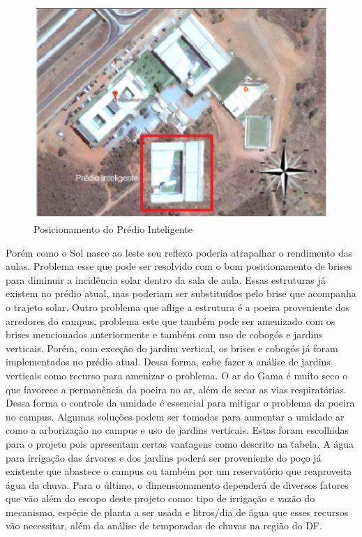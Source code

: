 \begin{figure}[!h]
  \centering
  \includegraphics[keepaspectratio=true,scale=1]{figuras/posicionamentodoprediointeligente.eps}
  \caption{Posicionamento do Prédio Inteligente}
  \label{fig:posicionamento}
\end{figure}

Porém como o Sol nasce ao leste seu reflexo poderia atrapalhar o rendimento das aulas. Problema esse que pode ser resolvido com o bom posicionamento de brises para diminuir a incidência solar dentro da sala de aula. Essas estruturas já existem no prédio atual, mas poderiam ser substituídos pelo brise que acompanha o trajeto solar.
Outro problema que aflige a estrutura é a poeira proveniente dos arredores do campus, problema este que também pode ser amenizado com os brises mencionados anteriormente e também com uso de cobogós e jardins verticais. Porém, com exceção do jardim vertical, os brises e cobogós já foram implementados no prédio atual. Dessa forma, cabe fazer a análise de jardins verticais como recurso para amenizar o problema.
O ar do Gama é muito seco o que favorece a permanência da poeira no ar, além de secar as vias respiratórias. Dessa forma o controle da umidade é essencial para mitigar o problema da poeira no campus. Algumas soluções podem ser tomadas para aumentar a umidade ar como a arborização no campus e uso de jardins verticais. Estas foram escolhidas para o projeto pois apresentam certas vantagens como descrito na tabela. A água para irrigação das árvores e dos jardins poderá ser proveniente do poço já existente que abastece o campus ou também por um reservatório que reaproveita água da chuva. Para o último, o dimensionamento dependerá de diversos fatores que vão além do escopo deste projeto como: tipo de irrigação e vazão do mecanismo, espécie de planta a ser usada e litros/dia de água que esses recursos vão necessitar, além da análise de temporadas de chuvas na região do DF.

